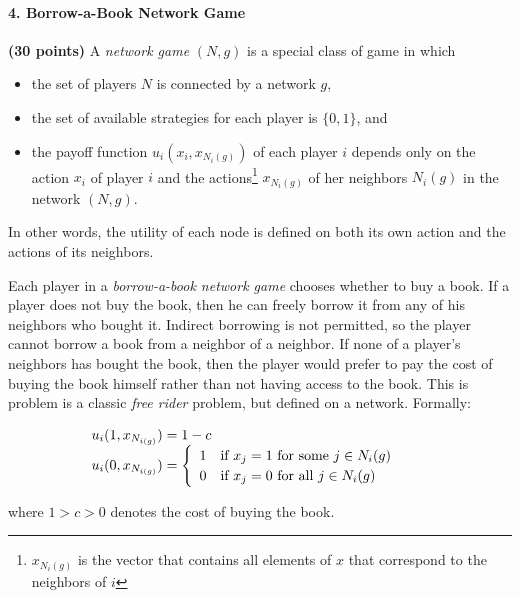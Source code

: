 \documentclass[11pt]{article}
\begin{document}
\paragraph{4. Borrow-a-Book Network Game} \textbf{(30 points)} A \emph{network game} $(N, g)$ is a special class of game in which 

\begin{itemize}
\item the set of players $N$ is connected by a network $g$,
\item the set of available strategies for each player is $\{0,1\}$, and
\item the payoff function $u_i(x_i, x_{N_i(g)})$ of each player $i$ depends only on the action $x_i$ of player $i$ and the actions\footnote{$x_{N_i(g)}$ is the vector that contains all elements of $x$ that correspond to the neighbors of $i$} $x_{N_i(g)}$ of her neighbors $N_i(g)$ in the network $(N,g)$.\end{itemize}

In other words, the utility of each node is defined on both its own action and the actions of its neighbors.

Each player in a \emph{borrow-a-book network game} chooses whether to buy a book. If a player does not buy the book, then he can freely borrow it  from any of his neighbors who bought it. Indirect borrowing is not permitted, so the player cannot borrow a book from a neighbor of a neighbor. If none of a player's neighbors has bought the book, then the player would prefer to pay the cost of buying the book himself rather than not having access to the book. This is problem is a classic \emph{free rider} problem, but defined on a network. Formally:

 $$\begin{array} {l l }
u_i(1, x_{N_{i(g)}})=1-c &  \\
u_i(0, x_{N_{i(g)}})=\begin{cases}\begin{array} {l l} 1 & \text{if} \ x_j=1 \ \text{for some} \ j\in N_i(g) \\  0 & \text{if} \ x_j=0 \ \text{for all} \ j\in N_i(g)\\ \end{array}\end{cases}
\end{array}$$
 
where $1>c>0$ denotes the cost of buying the book. 
\end{document}
